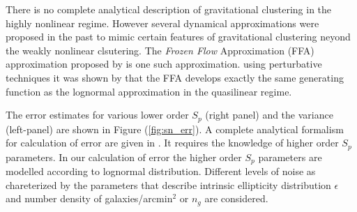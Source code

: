 \documentclass[usenatbib]{mn2e}
\begin{document}
There is no complete analytical description of gravitational clustering in the highly nonlinear
regime. However several dynamical approximations were proposed in the past to mimic 
certain features of gravitational clustering neyond the weakly nonlinear clsutering.
The  {\it Frozen Flow} Approximation (FFA) approximation proposed by \citep{MLMS92} is one such
approximation. using perturbative techniques it was shown by  \citep{MSS94} that the
FFA develops exactly the same generating function as the lognormal approximation 
in the quasilinear regime.
%

The error estimates for various lower order $S_p$ (right panel) and the variance (left-panel)
are shown in Figure (\ref{fig:sn_err}). A complete analytical formalism for calculation of error are
given in \cite{VaMuBa05}. It requires the knowledge of higher order $S_p$ parameters.
In our calculation of error the higher order $S_p$ parameters are modelled according to
lognormal distribution. Different levels of noise as chareterized by the parameters that
describe intrinsic ellipticity distribution $\epsilon$ and number density of galaxies/arcmin$^2$ or 
$n_g$ are considered.

%
\end{document}
